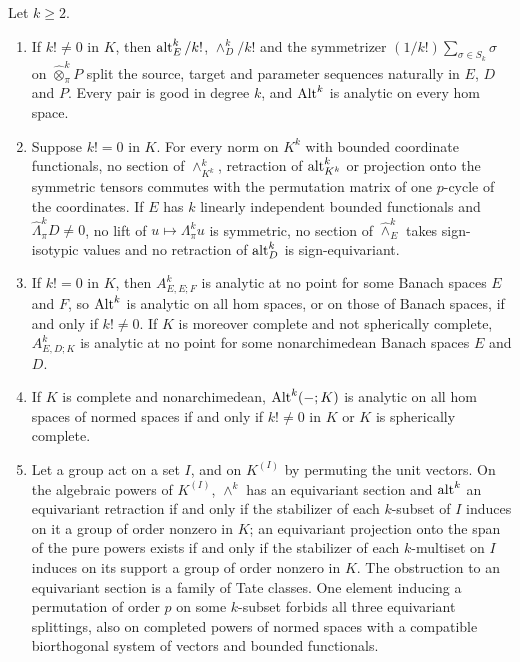 \begin{introtheorem}\label{intro:thm:B}
Let $k\ge2$.
\begin{enumerate}
\item If $k!\ne0$ in $K$, then $\operatorname{alt}^k_E/k!$, $\wedge^k_D/k!$ and the symmetrizer $(1/k!)\sum_{\sigma\in S_k}\sigma$ on
$\widehat\otimes^k_\pi P$ split the source, target and parameter sequences naturally in $E$, $D$ and $P$. Every pair is
good in degree $k$, and $\operatorname{Alt}^k$ is analytic on every hom space.
\item Suppose $k!=0$ in $K$. For every norm on $K^k$ with bounded coordinate functionals, no section of
$\wedge^k_{K^k}$, retraction of $\operatorname{alt}^k_{K^k}$ or projection onto the symmetric tensors commutes with the permutation
matrix of one $p$-cycle of the coordinates. If $E$ has $k$ linearly independent bounded functionals and
$\widehat\Lambda^k_\pi D\ne0$, no lift of $u\mapsto\Lambda^k_\pi u$ is symmetric, no section of $\widehat\wedge^k_E$
takes sign-isotypic values and no retraction of $\operatorname{alt}^k_D$ is sign-equivariant.
\item If $k!=0$ in $K$, then $A^k_{E,E;F}$ is analytic at no point for some Banach spaces $E$ and $F$, so $\operatorname{Alt}^k$ is
analytic on all hom spaces, or on those of Banach spaces, if and only if $k!\ne0$. If $K$ is moreover complete and not
spherically complete, $A^k_{E,D;K}$ is analytic at no point for some nonarchimedean Banach spaces $E$ and $D$.
\item If $K$ is complete and nonarchimedean, $\operatorname{Alt}^k(-;K)$ is analytic on all hom spaces of normed spaces if and only
if $k!\ne0$ in $K$ or $K$ is spherically complete.
\item Let a group act on a set $I$, and on $K^{(I)}$ by permuting the unit vectors. On the algebraic powers of
$K^{(I)}$, $\wedge^k$ has an equivariant section and $\operatorname{alt}^k$ an equivariant retraction if and only if the stabilizer of
each $k$-subset of $I$ induces on it a group of order nonzero in $K$; an equivariant projection onto the span of the
pure powers exists if and only if the stabilizer of each $k$-multiset on $I$ induces on its support a group of order
nonzero in $K$. The obstruction to an equivariant section is a family of Tate classes. One element inducing a
permutation of order $p$ on some $k$-subset forbids all three equivariant splittings, also on completed powers of normed
spaces with a compatible biorthogonal system of vectors and bounded functionals.
\end{enumerate}
\end{introtheorem}

